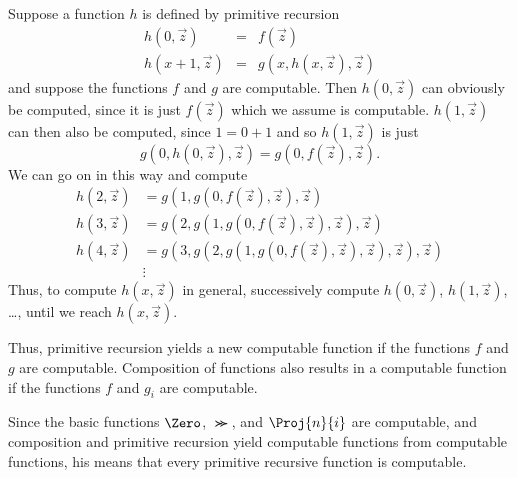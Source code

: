 \documentclass[../../../include/open-logic-section]{subfiles}
\begin{document}

Suppose a function $h$ is defined by primitive recursion
\begin{eqnarray*}
h(0,\vec z) & = & f(\vec z) \\
h(x+1, \vec z) & = & g(x, h(x, \vec z), \vec z)
\end{eqnarray*}
and suppose the functions $f$ and $g$ are computable.  Then $h(0, \vec
z)$ can obviously be computed, since it is just $f(\vec z)$ which we
assume is computable.  $h(1, \vec z)$ can then also be computed, since
$1 = 0 + 1$ and so $h(1, \vec z)$ is just
\[
 g(0, h(0, \vec z), \vec z) =  g(0, f(\vec z), \vec z).
\]
We can go on in this way and  compute
\begin{align*}
h(2, \vec z) & = g(1, g(0, f(\vec z), \vec z), \vec z)\\
h(3, \vec z) & = g(2, g(1, g(0, f(\vec z), \vec z), \vec z), \vec z)\\
h(4, \vec z) & = g(3, g(2, g(1, g(0, f(\vec z), \vec z), \vec z), \vec z), \vec z)\\
& \vdots
\end{align*}
Thus, to compute $h(x, \vec z)$ in general, successively compute $h(0,
\vec z)$, $h(1, \vec z)$, \dots, until we reach $h(x, \vec z)$.

Thus, primitive recursion yields a new computable function if the
functions $f$ and $g$ are computable.  Composition of functions also
results in a computable function if the functions $f$ and $g_i$ are
computable.

Since the basic functions $\Zero$, $\Succ$, and $\Proj{n}{i}$ are computable,
and composition and primitive recursion yield computable functions
from computable functions, his means that every primitive recursive
function is computable.
\end{document}
